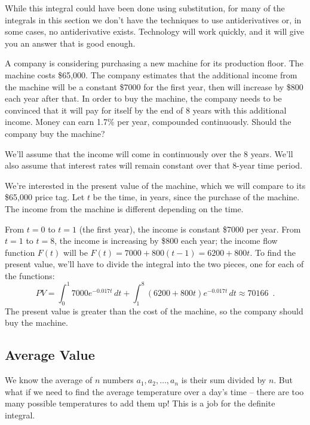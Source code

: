 While this integral could have been done using substitution, for many of the integrals in this section we don't have the techniques to use antiderivatives or, in some cases, no antiderivative exists. Technology will work quickly, and it will give you an answer that is good enough.

\begin{example}
A company is considering purchasing a new machine for its production floor. The machine costs \$65,000. The company estimates that the additional income from the machine will be a constant \$7000 for the first year, then will increase by \$800 each year after that. In order to buy the machine, the company needs to be convinced that it will pay for itself by the end of 8 years with this additional income. Money can earn 1.7\% per year, compounded continuously. Should the company buy the machine?

\begin{solution}
  We'll assume that the income will come in continuously over the 8 years. We'll also assume that interest rates will remain constant over that 8-year time period.

We're interested in the present value of the machine, which we will compare to its \$65,000 price tag. Let $t$ be the time, in years, since the purchase of the machine. The income from the machine is different depending on the time.

From $t=0$ to $t=1$ (the first year), the income is constant \$7000 per year. From $t=1$ to $t=8$, the income is increasing by \$800 each year; the income flow function $F(t)$ will be $F(t)=7000+800(t-1)=6200+800t$. To find the present value, we'll have to divide the integral into the two pieces, one for each of the functions:
$$PV=\int_0^1 7000e^{-0.017t}\,dt + \int_1^8 (6200+800t)e^{-0.017t}\,dt\approx   70166 \enspace.$$
The present value is greater than the cost of the machine, so the company should buy the machine.
\end{solution}\end{example}

\subsection{Average Value}
We know the average of $n$ numbers $a_1, a_2,\ldots, a_n$ is their sum divided by $n$. But what if we need to find the average temperature over a day's time -- there are too many possible temperatures to add them up! This is a job for the definite integral.

